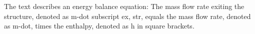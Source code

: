 The text describes an energy balance equation:
The mass flow rate exiting the structure, denoted as m-dot subscript ex, str, equals the mass flow rate, denoted as m-dot, times the enthalpy, denoted as h in square brackets.